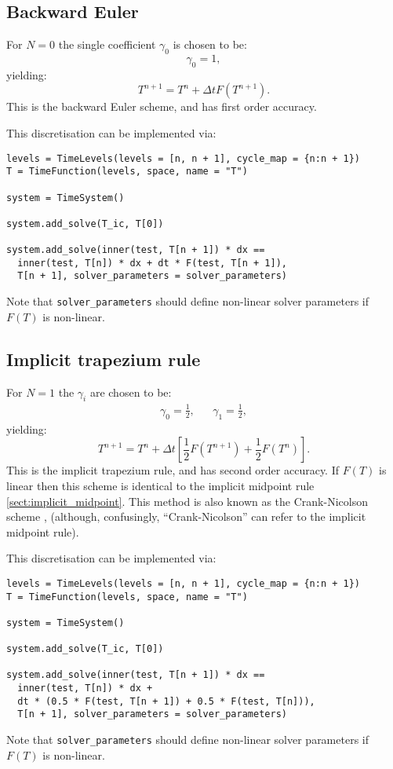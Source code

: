 \documentclass[a4paper]{book}
\begin{document}
\subsection{Backward Euler}\label{sect:be}

For $N = 0$ the single coefficient $\gamma_0$ is chosen to be:
\begin{equation}
  \gamma_0 = 1,
\end{equation}
yielding:
\begin{equation}
  T^{n + 1} = T^n + \Delta t F(T^{n + 1}).
\end{equation}
This is the backward Euler scheme, and has first order accuracy.

This discretisation can be implemented via:
\begin{lstlisting}
levels = TimeLevels(levels = [n, n + 1], cycle_map = {n:n + 1})
T = TimeFunction(levels, space, name = "T")

system = TimeSystem()

system.add_solve(T_ic, T[0])

system.add_solve(inner(test, T[n + 1]) * dx ==
  inner(test, T[n]) * dx + dt * F(test, T[n + 1]),
  T[n + 1], solver_parameters = solver_parameters)
\end{lstlisting}
Note that \verb+solver_parameters+ should define non-linear solver parameters if
$F(T)$ is non-linear.

\subsection{Implicit trapezium rule}\label{sect:implicit_trapezium}

For $N = 1$ the $\gamma_i$ are chosen to be:
\begin{align}
  \gamma_0 = \frac{1}{2}, & & \gamma_1 = \frac{1}{2},
\end{align}
yielding:
\begin{equation}
  T^{n + 1} = T^n + \Delta t \left[ \frac{1}{2} F(T^{n + 1}) + \frac{1}{2} F(T^n) \right].
\end{equation}
This is the implicit trapezium rule, and has second order accuracy. If $F(T)$ is
linear then this scheme is identical to the implicit midpoint rule
\ref{sect:implicit_midpoint}. This method is also known as the Crank-Nicolson
scheme \citep[e.g.][section 3.4]{donea2003}, (although, confusingly,
``Crank-Nicolson'' can refer to the implicit midpoint rule).

This discretisation can be implemented via:
\begin{lstlisting}
levels = TimeLevels(levels = [n, n + 1], cycle_map = {n:n + 1})
T = TimeFunction(levels, space, name = "T")

system = TimeSystem()

system.add_solve(T_ic, T[0])

system.add_solve(inner(test, T[n + 1]) * dx ==
  inner(test, T[n]) * dx +
  dt * (0.5 * F(test, T[n + 1]) + 0.5 * F(test, T[n])),
  T[n + 1], solver_parameters = solver_parameters)
\end{lstlisting}
Note that \verb+solver_parameters+ should define non-linear solver parameters if
$F(T)$ is non-linear.
\end{document}

